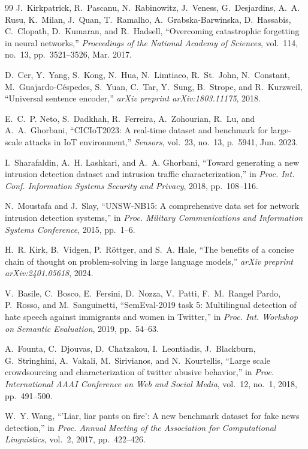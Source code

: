 \documentclass[12pt,a4paper]{article}
\theoremstyle{definition}
\begin{document}
\begin{thebibliography}{99}
J.~Kirkpatrick, R.~Pascanu, N.~Rabinowitz, J.~Veness, G.~Desjardins, A.~A. Rusu, K.~Milan, J.~Quan, T.~Ramalho, A.~Grabska-Barwinska, D.~Hassabis, C.~Clopath, D.~Kumaran, and R.~Hadsell, ``Overcoming catastrophic forgetting in neural networks,'' \emph{Proceedings of the National Academy of Sciences}, vol.~114, no.~13, pp.~3521--3526, Mar. 2017.

D.~Cer, Y.~Yang, S.~Kong, N.~Hua, N.~Limtiaco, R.~St.~John, N.~Constant, M.~Guajardo-Céspedes, S.~Yuan, C.~Tar, Y.~Sung, B.~Strope, and R.~Kurzweil, ``Universal sentence encoder,'' \emph{arXiv preprint arXiv:1803.11175}, 2018.

E.~C.~P. Neto, S.~Dadkhah, R.~Ferreira, A.~Zohourian, R.~Lu, and A.~A.~Ghorbani, ``CICIoT2023: A real-time dataset and benchmark for large-scale attacks in IoT environment,'' \emph{Sensors}, vol.~23, no.~13, p.~5941, Jun. 2023.

I.~Sharafaldin, A.~H. Lashkari, and A.~A. Ghorbani, ``Toward generating a new intrusion detection dataset and intrusion traffic characterization,'' in \emph{Proc. Int. Conf. Information Systems Security and Privacy}, 2018, pp.~108--116.

N.~Moustafa and J.~Slay, ``UNSW-NB15: A comprehensive data set for network intrusion detection systems,'' in \emph{Proc. Military Communications and Information Systems Conference}, 2015, pp.~1--6.

H.~R. Kirk, B.~Vidgen, P.~Röttger, and S.~A. Hale, ``The benefits of a concise chain of thought on problem-solving in large language models,'' \emph{arXiv preprint arXiv:2401.05618}, 2024.

V.~Basile, C.~Bosco, E.~Fersini, D.~Nozza, V.~Patti, F.~M.~Rangel Pardo, P.~Rosso, and M.~Sanguinetti, ``SemEval-2019 task 5: Multilingual detection of hate speech against immigrants and women in Twitter,'' in \emph{Proc. Int. Workshop on Semantic Evaluation}, 2019, pp.~54--63.

A.~Founta, C.~Djouvas, D.~Chatzakou, I.~Leontiadis, J.~Blackburn, G.~Stringhini, A.~Vakali, M.~Sirivianos, and N.~Kourtellis, ``Large scale crowdsourcing and characterization of twitter abusive behavior,'' in \emph{Proc. International AAAI Conference on Web and Social Media}, vol.~12, no.~1, 2018, pp.~491--500.

W.~Y. Wang, ``'Liar, liar pants on fire': A new benchmark dataset for fake news detection,'' in \emph{Proc. Annual Meeting of the Association for Computational Linguistics}, vol.~2, 2017, pp.~422--426.


\end{thebibliography}
\end{document}

